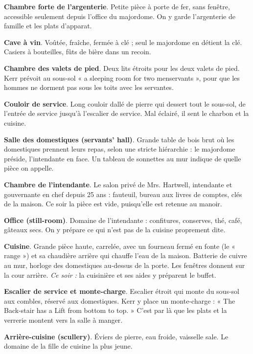 \documentclass[10pt,a4paper]{article}
\begin{document}
\begin{minipage}[t]{8.95cm}
\begin{descr}
\item[\textbf{S4}] \textbf{Chambre forte de l'argenterie}. Petite pièce à porte de fer, sans fenêtre, accessible seulement depuis l'office du majordome. On y garde l'argenterie de famille et les plats d'apparat.
\item[\textbf{S5}] \textbf{Cave à vin}. Voûtée, fraîche, fermée à clé ; seul le majordome en détient la clé. Casiers à bouteilles, fûts de bière dans un recoin.
\item[\textbf{S6}] \textbf{Chambre des valets de pied}. Deux lits étroits pour les deux valets de pied. Kerr prévoit au sous-sol « a sleeping room for two menservants », pour que les hommes ne dorment pas sous les toits avec les servantes.
\item[\textbf{S7}] \textbf{Couloir de service}. Long couloir dallé de pierre qui dessert tout le sous-sol, de l'entrée de service jusqu'à l'escalier de service. Mal éclairé, il sent le charbon et la cuisine.
\item[\textbf{S8}] \textbf{Salle des domestiques (servants' hall)}. Grande table de bois brut où les domestiques prennent leurs repas, selon une stricte hiérarchie : le majordome préside, l'intendante en face. Un tableau de sonnettes au mur indique de quelle pièce on appelle.
\item[\textbf{S9}] \textbf{Chambre de l'intendante}. Le salon privé de Mrs. Hartwell, intendante et gouvernante en chef depuis 25 ans : fauteuil, bureau aux livres de comptes, clés de la maison. Ce soir la pièce est vide, puisqu'elle est retenue au manoir.
\item[\textbf{S10}] \textbf{Office (still-room)}. Domaine de l'intendante : confitures, conserves, thé, café, gâteaux secs. On y prépare ce qui n'est pas de la cuisine proprement dite.
\item[\textbf{S11}] \textbf{Cuisine}. Grande pièce haute, carrelée, avec un fourneau fermé en fonte (le « range ») et sa chaudière arrière qui chauffe l'eau de la maison. Batterie de cuivre au mur, horloge des domestiques au-dessus de la porte. Les fenêtres donnent sur la cour arrière. \textit{Ce soir :} la cuisinière et ses aides y préparent le buffet.
\item[\textbf{S12}] \textbf{Escalier de service et monte-charge}. Escalier étroit qui monte du sous-sol aux combles, réservé aux domestiques. Kerr y place un monte-charge : « The Back-stair has a Lift from bottom to top. » C'est par là que les plats et la verrerie montent vers la salle à manger.
\item[\textbf{S13}] \textbf{Arrière-cuisine (scullery)}. Éviers de pierre, eau froide, vaisselle sale. Le domaine de la fille de cuisine la plus jeune.

\end{descr}
\end{minipage}
\end{document}
